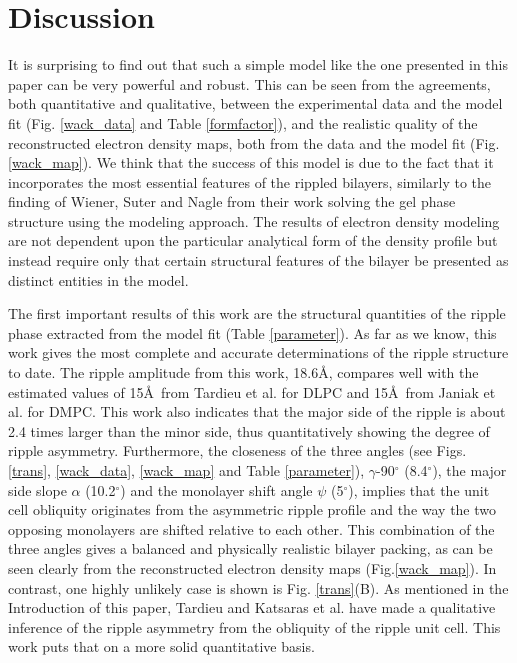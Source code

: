 \section{Discussion}

It is surprising to find out that such a simple model like the one
presented in this paper can be very powerful and robust. This can
be seen from the agreements, both quantitative and qualitative,
between the experimental data and the model fit (Fig. \ref{wack_data} and
Table \ref{formfactor}), and the realistic quality of the reconstructed 
electron density maps, both from the data and the model fit 
(Fig. \ref{wack_map}). We think that the success of this model is
due to the fact that it incorporates the most essential features of the rippled 
bilayers, similarly to the finding of Wiener, Suter and Nagle
\cite{WSN89} from their work solving the gel phase structure using
the modeling approach. The results of electron density modeling are not 
dependent upon the particular analytical form of the density profile but 
instead require only that certain structural features of the bilayer be 
presented as distinct entities in the model.

The first important results of this work are the structural quantities
of the ripple phase extracted from the model fit (Table \ref{parameter}). 
As far as we know, this work gives the most complete and accurate 
determinations of the ripple structure to date. The
ripple amplitude from this work, 18.6\AA, compares well with the estimated
values of 15\AA\ from Tardieu et al. \cite{Tar73} for DLPC and 15\AA\ from 
Janiak et al. \cite{JanSS79} for DMPC. This work also indicates that the 
major side of the ripple is about 2.4 times larger than the minor side, thus 
quantitatively showing the degree of ripple asymmetry. Furthermore, the 
closeness of the three angles (see Figs. \ref{trans}, \ref{wack_data}, 
\ref{wack_map} and Table \ref{parameter}), $\gamma$-90$^{\circ}$ 
(8.4$^{\circ}$), the major side slope $\alpha$ (10.2$^{\circ}$) and the 
monolayer shift angle $\psi$ (5$^{\circ}$), implies that the unit cell
obliquity originates from the asymmetric ripple profile and the way the
two opposing monolayers are shifted relative to each other. This combination
of the three angles gives a balanced and physically realistic bilayer
packing, as can be seen clearly from the reconstructed electron density
maps (Fig.\ref{wack_map}). In contrast, one highly unlikely case is shown
is Fig. \ref{trans}(B). As mentioned in the Introduction of this
paper, Tardieu \cite{Tar72} and Katsaras et al. \cite{Kat95} have made
a qualitative inference of the ripple asymmetry from the obliquity of the 
ripple unit cell. This work puts that on a more solid quantitative basis.

